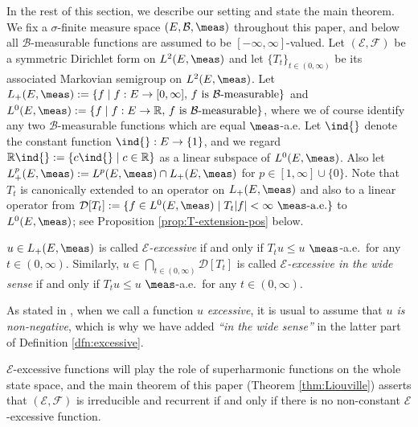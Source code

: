In the rest of this section, we describe our setting and state the main theorem.
We fix a $\sigma$-finite measure space $(E,\mathcal{B},\meas)$ throughout this paper,
and below all $\mathcal{B}$-measurable functions are assumed to be $[-\infty,\infty]$-valued.
Let $(\mathcal{E},\mathcal{F})$ be a symmetric Dirichlet form on $L^{2}(E,\meas)$ and
let $\{T_{t}\}_{t\in(0,\infty)}$ be its
associated Markovian semigroup on $L^{2}(E,\meas)$. Let
$L_{+}(E,\meas):=\{f\mid f:E\to[0,\infty],\,f\textrm{ is }\mathcal{B}\textrm{-measurable}\}$
and
$L^{0}(E,\meas):=\{f\mid f:E\to\mathbb{R},\,f\textrm{ is }\mathcal{B}\textrm{-measurable}\}$,
where we of course identify any two $\mathcal{B}$-measurable functions which are
equal $\meas$-a.e. Let $\ind{}$ denote the constant function $\ind{}:E\to\{1\}$,
and we regard $\mathbb{R}\ind{}:=\{c\ind{}\mid c\in\mathbb{R}\}$ as
a linear subspace of $L^{0}(E,\meas)$. Also let
$L^{p}_{+}(E,\meas):=L^{p}(E,\meas)\cap L_{+}(E,\meas)$
for $p\in[1,\infty]\cup\{0\}$.
Note that $T_{t}$ is canonically extended to an operator on $L_{+}(E,\meas)$ and
also to a linear operator from
$\mathcal{D}[T_{t}]:=\{f\in L^{0}(E,\meas)\mid T_{t}|f|<\infty\ \meas\textrm{-a.e.}\}$
to $L^{0}(E,\meas)$; see Proposition \ref{prop:T-extension-pos} below.
%
\begin{dfn}\label{dfn:excessive}
$u\in L_{+}(E,\meas)$ is called \emph{$\mathcal{E}$-excessive} if and only if
$T_{t}u\leq u$ $\meas$-a.e.\ for any $t\in(0,\infty)$. Similarly,
$u\in\bigcap_{t\in(0,\infty)}\mathcal{D}[T_{t}]$ is called
\emph{$\mathcal{E}$-excessive in the wide sense} if and only if
$T_{t}u\leq u$ $\meas$-a.e.\ for any $t\in(0,\infty)$.
\end{dfn}
%
\begin{remn}
As stated in \cite{BG,CF,FOT,FT,Shigekawa:convex}, when we call a function $u$
\emph{excessive}, it is usual to assume that \emph{$u$ is non-negative},
which is why we have added \emph{``in the wide sense''}
in the latter part of Definition \ref{dfn:excessive}.
\end{remn}
%
$\mathcal{E}$-excessive functions will play the role of superharmonic functions on
the whole state space, and the main theorem of this paper (Theorem \ref{thm:Liouville})
asserts that $(\mathcal{E},\mathcal{F})$ is irreducible and recurrent if and only if
there is no non-constant $\mathcal{E}$-excessive function.

